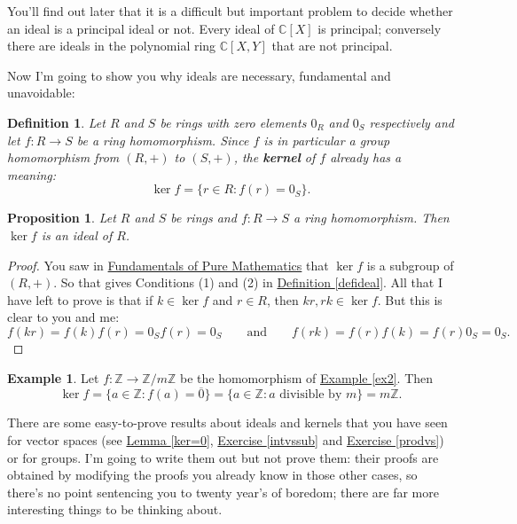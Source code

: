 \documentclass[11pt]{amsbook}
\newtheorem{definition}[theorem]{Definition}
\newtheorem{proposition}[theorem]{Proposition}
\theoremstyle{definition}
\newtheorem{ex}[theorem]{Example}
\begin{document}
You'll find out later that it is a difficult but important problem to decide whether an ideal is a principal
ideal or not. Every ideal of $\mathbb{C}[X]$ is principal; conversely there are ideals in the polynomial ring $\mathbb{C}[X,Y]$ that are not principal.
 \medskip

 Now I'm going to show you why ideals are necessary, fundamental and unavoidable:

\begin{definition} Let $R$ and $S$ be rings with zero elements $0_R$ and $0_S$ respectively and let $f:R \to S$ be a ring homomorphism. Since $f$ is in particular a group homomorphism from $(R,+)$ to $(S,+)$, the \textbf{kernel} of $f$ already has a meaning: $$\ker f = \{ r\in R: f(r) = 0_S\}.$$
\end{definition}

\begin{proposition}\label{kerideal} Let $R$ and $S$ be rings and $f:R \to S$ a ring homomorphism. Then $\ker f$ is an ideal of $R$.
\end{proposition}
\begin{proof} You saw in \href{http://www.drps.ed.ac.uk/12-13/dpt/cxmath08064.htm}{Fundamentals of Pure Mathematics} that $\ker f$ is a subgroup of $(R,+)$. So that gives Conditions (1) and (2) in \hyperref[defideal]{Definition \ref{defideal}}. All that I have left to prove is that if $k\in \ker f$ and $r\in R$, then $kr,rk \in \ker f$. But this is clear to you and me: $$f(kr) = f(k)f(r) = 0_S f(r) = 0_S \qquad \text{and} \qquad f(rk) = f(r)f(k) = f(r) 0_S = 0_S.$$
\end{proof}

\begin{ex} \label{kerz} Let $f : \mathbb{Z} \to \mathbb{Z}/m\mathbb{Z}$ be the homomorphism of \hyperref[ex2]{Example \ref{ex2}}. Then $$\ker f = \{ a \in \mathbb{Z}: f(a) = \overline{0} \} =  \{ a\in \mathbb{Z} : a \text{ divisible by }m \} = m\mathbb{Z}.$$
\end{ex}

There are some easy-to-prove results about ideals and kernels that you have seen for vector spaces (see \hyperref[ker=0]{Lemma \ref{ker=0}}, \hyperref[intvssub]{Exercise \ref{intvssub}} and \hyperref[prodvs]{Exercise \ref{prodvs}}) or for groups. I'm going to write them out but not prove them: their proofs are obtained by modifying the proofs you already know in those other cases, so there's no point sentencing you to twenty year's of boredom; there are far more interesting things to be thinking about.
\end{document}

